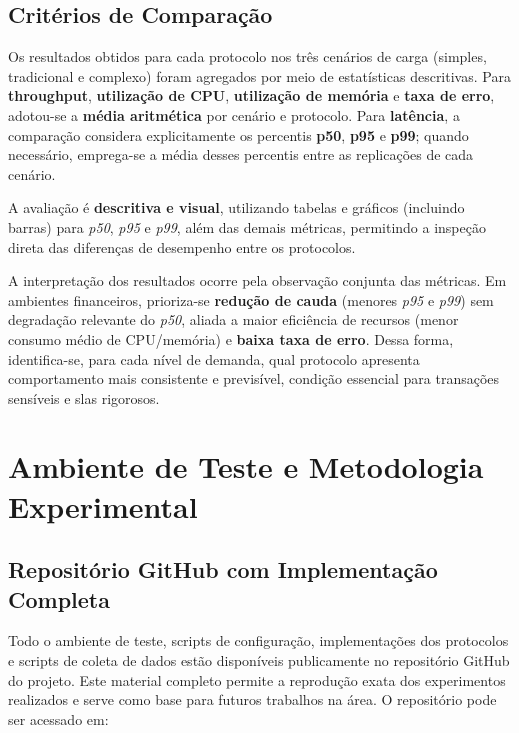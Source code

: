 \subsection{Critérios de Comparação}

Os resultados obtidos para cada protocolo nos três cenários de carga (simples, tradicional e complexo) foram agregados por meio de estatísticas descritivas. Para \textbf{throughput}, \textbf{utilização de CPU}, \textbf{utilização de memória} e \textbf{taxa de erro}, adotou-se a \textbf{média aritmética} por cenário e protocolo. Para \textbf{latência}, a comparação considera explicitamente os percentis \textbf{p50}, \textbf{p95} e \textbf{p99}; quando necessário, emprega-se a média desses percentis entre as replicações de cada cenário.

A avaliação é \textbf{descritiva e visual}, utilizando tabelas e gráficos (incluindo barras) para \textit{p50}, \textit{p95} e \textit{p99}, além das demais métricas, permitindo a inspeção direta das diferenças de desempenho entre os protocolos.

A interpretação dos resultados ocorre pela observação conjunta das métricas. Em ambientes financeiros, prioriza-se \textbf{redução de cauda} (menores \textit{p95} e \textit{p99}) sem degradação relevante do \textit{p50}, aliada a maior eficiência de recursos (menor consumo médio de CPU/memória) e \textbf{baixa taxa de erro}. Dessa forma, identifica-se, para cada nível de demanda, qual protocolo apresenta comportamento mais consistente e previsível, condição essencial para transações sensíveis e \acrshort{sla}s rigorosos.

\section{Ambiente de Teste e Metodologia Experimental}
\label{sec:ambiente_teste}

\subsection{Repositório GitHub com Implementação Completa}
\label{subsec:repositorio_github}

Todo o ambiente de teste, scripts de configuração, implementações dos protocolos e scripts de coleta de dados estão disponíveis publicamente no repositório GitHub do projeto. Este material completo permite a reprodução exata dos experimentos realizados e serve como base para futuros trabalhos na área. O repositório pode ser acessado em:

